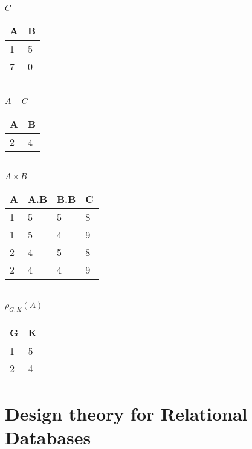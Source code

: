 \documentclass[12pt, a4paper]{article}
\begin{document}
			\begin{minipage}[t]{0.32\textwidth}
				\begin{center}
				$C$\\
				\begin{tabular}{|l|l|}
				\hline
				A & B \\ \hline
				1 & 5 \\ \hline
				7 & 0 \\ \hline
				\end{tabular}\\[4mm]
				$A- C$\\
				\begin{tabular}{|l|l|}
				\hline
				A & B \\ \hline
				2 & 4 \\ \hline
				\end{tabular}\\[4mm]
				$A\times B$\\
				\begin{tabular}{|l|l|l|l|}
				\hline
				A & A.B & B.B & C \\ \hline
				1 & 5 & 5 & 8\\ \hline
				1 & 5 & 4 & 9\\ \hline
				2 & 4 & 5 & 8\\ \hline
				2 & 4 & 4 & 9\\ \hline
				\end{tabular}\\[4mm]
				$\rho_{G,K}(A)$\\
				\begin{tabular}{|l|l|}
				\hline
				G & K \\ \hline
				1 & 5 \\ \hline
				2 & 4 \\ \hline
				\end{tabular}
				\end{center}				
			\end{minipage}
	\section{Design theory for Relational Databases}
\end{document}

